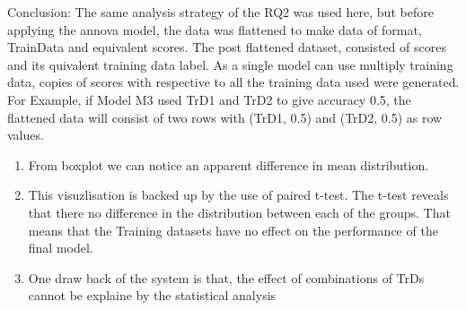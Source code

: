 \documentclass[]{article}
\providecommand{\tightlist}{%
  \setlength{\itemsep}{0pt}\setlength{\parskip}{0pt}}
\begin{document}
Conclusion: The same analysis strategy of the RQ2 was used here, but
before applying the annova model, the data was flattened to make data of
format, TrainData and equivalent scores. The post flattened dataset,
consisted of scores and its quivalent training data label. As a single
model can use multiply training data, copies of scores with respective
to all the training data used were generated. For Example, if Model M3
used TrD1 and TrD2 to give accuracy 0.5, the flattened data will consist
of two rows with (TrD1, 0.5) and (TrD2, 0.5) as row values.

\begin{enumerate}
\def\labelenumi{\arabic{enumi}.}
\tightlist
\item
  From boxplot we can notice an apparent difference in mean
  distribution.
\item
  This visuzlisation is backed up by the use of paired t-test. The
  t-test reveals that there no difference in the distribution between
  each of the groups. That means that the Training datasets have no
  effect on the performance of the final model.
\item
  One draw back of the system is that, the effect of combinations of
  TrDs cannot be explaine by the statistical analysis
\end{enumerate}
\end{document}
